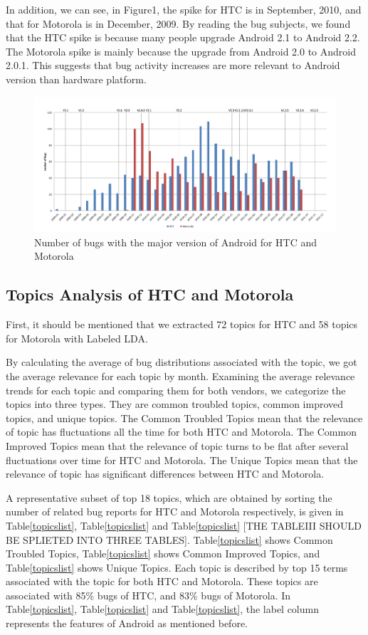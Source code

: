 \documentclass[10pt, conference, compsocconf]{IEEEtran}
\begin{document}
In addition, we can see, in Figure1, the spike for HTC is in September, 2010, and that for Motorola is in December, 2009. By reading the bug subjects, we found that the HTC spike is because many people upgrade Android 2.1 to Android 2.2. The Motorola spike is mainly because the upgrade from Android 2.0 to Android 2.0.1. This suggests that bug activity increases are more relevant to Android version than hardware platform.  

\begin{figure}[htb]
\centering
\includegraphics[width=1\textwidth]{bugovertime.png}
\caption{Number of bugs with the major version of Android for HTC and Motorola}
\label{bugovertime}
\end{figure}


\subsection{Topics Analysis of HTC and Motorola}

First, it should be mentioned that we extracted 72 topics for HTC and 58 topics for Motorola with Labeled LDA.

By calculating the average of bug distributions associated with the topic, we got the average relevance for each topic by month. Examining the average relevance trends for each topic and comparing them for both vendors, we categorize the topics into three types. They are common troubled topics, common improved topics, and unique topics. The Common Troubled Topics mean that the relevance of topic has fluctuations all the time for both HTC and Motorola. The Common Improved Topics mean that the relevance of topic turns to be flat after several fluctuations over time for HTC and Motorola. The Unique Topics mean that the relevance of topic has significant differences between HTC and Motorola.

A representative subset of top 18 topics, which are obtained by sorting the number of related bug reports for HTC and Motorola respectively, is given in Table\ref{topicslist}, Table\ref{topicslist} and Table\ref{topicslist} [THE TABLEIII SHOULD BE SPLIETED INTO THREE TABLES]. Table\ref{topicslist} shows Common Troubled Topics, Table\ref{topicslist} shows Common Improved Topics, and Table\ref{topicslist} shows Unique Topics. Each topic is described by top 15 terms associated with the topic for both HTC and Motorola. These topics are associated with 85\% bugs of HTC, and 83\% bugs of Motorola. In Table\ref{topicslist}, Table\ref{topicslist} and Table\ref{topicslist}, the label column represents the features of Android as mentioned before.
\end{document}
